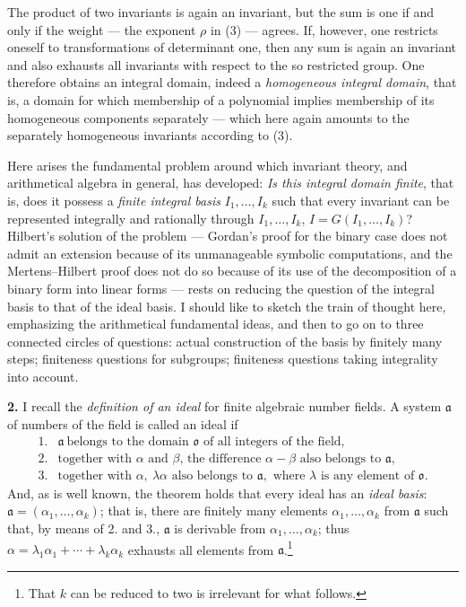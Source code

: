 \documentclass[11pt]{article}
\providecommand{\mo}{\mathfrak o}
\providecommand{\ma}{\mathfrak a}
\begin{document}
The product of two invariants is again an invariant, but the sum is one if and only if the weight --- the exponent $\rho$ in (3) --- agrees. If, however, one restricts oneself to transformations of determinant one, then any sum is again an invariant and also exhausts all invariants with respect to the so restricted group. One therefore obtains an integral domain, indeed a \emph{homogeneous integral domain}, that is, a domain for which membership of a polynomial implies membership of its homogeneous components separately --- which here again amounts to the separately homogeneous invariants according to (3).

Here arises the fundamental problem around which invariant theory, and arithmetical algebra in general, has developed: \emph{Is this integral domain finite}, that is, does it possess a \emph{finite integral basis} $I_1,\ldots,I_k$ such that every invariant can be represented integrally and rationally through $I_1,\ldots,I_k$, $I=G(I_1,\ldots,I_k)$? Hilbert's solution of the problem --- Gordan's proof for the binary case does not admit an extension because of its unmanageable symbolic computations, and the Mertens--Hilbert proof does not do so because of its use of the decomposition of a binary form into linear forms --- rests on reducing the question of the integral basis to that of the ideal basis. I should like to sketch the train of thought here, emphasizing the arithmetical fundamental ideas, and then to go on to three connected circles of questions: actual construction of the basis by finitely many steps; finiteness questions for subgroups; finiteness questions taking integrality into account.

\textbf{2.} I recall the \emph{definition of an ideal} for finite algebraic number fields. A system $\ma$ of numbers of the field is called an ideal if
\[
\begin{array}{ll}
1.& \ma\ \text{belongs to the domain }\mo\text{ of all integers of the field},\\
2.& \text{together with }\alpha\text{ and }\beta\text{, the difference }\alpha-\beta\text{ also belongs to }\ma,\\
3.& \text{together with }\alpha,\ \lambda\alpha\text{ also belongs to }\ma,\text{ where }\lambda\text{ is any element of }\mo.
\end{array}
\]
And, as is well known, the theorem holds that every ideal has an \emph{ideal basis}: $\ma=(\alpha_1,\ldots,\alpha_k)$; that is, there are finitely many elements $\alpha_1,\ldots,\alpha_k$ from $\ma$ such that, by means of 2. and 3., $\ma$ is derivable from $\alpha_1,\ldots,\alpha_k$; thus $\alpha=\lambda_1\alpha_1+\cdots+\lambda_k\alpha_k$ exhausts all elements from $\ma$.\footnote{That $k$ can be reduced to two is irrelevant for what follows.}
\end{document}
